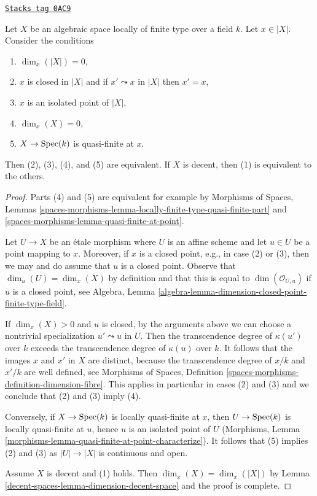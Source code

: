 \begin{lemma}
\label{decent-spaces-lemma-conditions-on-point-on-space-over-field}
\href{https://stacks.math.columbia.edu/tag/0AC9}{\texttt{Stacks tag 0AC9}}

Let $X$ be an algebraic space locally of finite type over a field $k$.
Let $x \in |X|$. Consider the conditions
\begin{enumerate}
\item $\dim_x(|X|) = 0$,
\item $x$ is closed in $|X|$ and if $x' \leadsto x$  in $|X|$ then $x' = x$,
\item $x$ is an isolated point of $|X|$,
\item $\dim_x(X) = 0$,
\item $X \to \operatorname{Spec}(k)$ is quasi-finite at $x$.
\end{enumerate}
Then (2), (3), (4), and (5) are equivalent.
If $X$ is decent, then (1) is equivalent to the others.
\end{lemma}

\begin{proof}
Parts (4) and (5) are equivalent for example by
Morphisms of Spaces, Lemmas
\ref{spaces-morphisms-lemma-locally-finite-type-quasi-finite-part} and
\ref{spaces-morphisms-lemma-quasi-finite-at-point}.

\medskip\noindent
Let $U \to X$ be an \'etale morphism where $U$ is an affine scheme and let
$u \in U$ be a point mapping to $x$. Moreover, if $x$ is a closed
point, e.g., in case (2) or (3), then we may and do assume that $u$
is a closed point. Observe that $\dim_u(U) = \dim_x(X)$ by definition
and that this is equal to $\dim(\mathcal{O}_{U, u})$ if $u$ is a closed
point, see Algebra, Lemma
\ref{algebra-lemma-dimension-closed-point-finite-type-field}.

\medskip\noindent
If $\dim_x(X) > 0$ and $u$ is closed, by the arguments above
we can choose a nontrivial
specialization $u' \leadsto u$ in $U$. Then the transcendence degree
of $\kappa(u')$ over $k$ exceeds the transcendence degree of
$\kappa(u)$ over $k$. It follows that the images $x$ and $x'$ in $X$
are distinct, because the transcendence degree of $x/k$ and $x'/k$
are well defined, see Morphisms of Spaces, Definition
\ref{spaces-morphisms-definition-dimension-fibre}.
This applies in particular in cases (2) and (3) and we
conclude that (2) and (3) imply (4).

\medskip\noindent
Conversely, if $X \to \operatorname{Spec}(k)$ is locally quasi-finite at $x$, then
$U \to \operatorname{Spec}(k)$ is locally quasi-finite at $u$, hence $u$ is an
isolated point of $U$
(Morphisms, Lemma \ref{morphisms-lemma-quasi-finite-at-point-characterize}).
It follows that (5) implies (2) and (3) as
$|U| \to |X|$ is continuous and open.

\medskip\noindent
Assume $X$ is decent and (1) holds. Then $\dim_x(X) = \dim_x(|X|)$
by Lemma \ref{decent-spaces-lemma-dimension-decent-space} and the proof is complete.
\end{proof}

